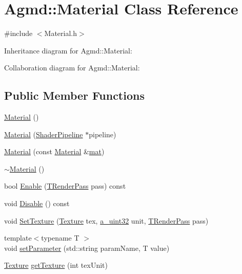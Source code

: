 \hypertarget{class_agmd_1_1_material}{\section{Agmd\+:\+:Material Class Reference}
\label{class_agmd_1_1_material}
}


{\ttfamily \#include $<$Material.\+h$>$}



Inheritance diagram for Agmd\+:\+:Material\+:


Collaboration diagram for Agmd\+:\+:Material\+:
\subsection*{Public Member Functions}
\begin{DoxyCompactItemize}
\item 
\hyperlink{class_agmd_1_1_material_a7c35bec59889965c3904ded79421118d}{Material} ()
\item 
\hyperlink{class_agmd_1_1_material_a5ce23c915abccb76f19152553aec79d7}{Material} (\hyperlink{class_agmd_1_1_shader_pipeline}{Shader\+Pipeline} $\ast$pipeline)
\item 
\hyperlink{class_agmd_1_1_material_a5dc5c2035ed29fda34ce3293e377daa2}{Material} (const \hyperlink{class_agmd_1_1_material}{Material} \&\hyperlink{_examples_2_planet_2_app_8cpp_ab1c3784ff3dfc4e8cd95bfcb681f720b}{mat})
\item 
\hyperlink{class_agmd_1_1_material_aee383c68e13c459a0005b9c276160cbd}{$\sim$\+Material} ()
\item 
bool \hyperlink{class_agmd_1_1_material_a63fa054123ba837b0945ddafe7a5e868}{Enable} (\hyperlink{namespace_agmd_a893087981df53d0bf39466e9039aeb73}{T\+Render\+Pass} pass) const 
\item 
void \hyperlink{class_agmd_1_1_material_afd21325b27cf0c6685a83e12af4e55dd}{Disable} () const 
\item 
void \hyperlink{class_agmd_1_1_material_a4f509eaf7d450429738334ee87faba0c}{Set\+Texture} (\hyperlink{class_agmd_1_1_texture}{Texture} tex, \hyperlink{_common_defines_8h_a964296f9770051b9e4807b1f180dd416}{a\+\_\+uint32} unit, \hyperlink{namespace_agmd_a893087981df53d0bf39466e9039aeb73}{T\+Render\+Pass} pass)
\item 
{\footnotesize template$<$typename T $>$ }\\void \hyperlink{class_agmd_1_1_material_a642ff3ece71ba53608d9fc9cafeaf61a}{set\+Parameter} (std\+::string param\+Name, T value)
\item 
\hyperlink{class_agmd_1_1_texture}{Texture} \hyperlink{class_agmd_1_1_material_ac2f68c4631b260bdf7873ee921d5812e}{get\+Texture} (int tex\+Unit)
\end{DoxyCompactItemize}


